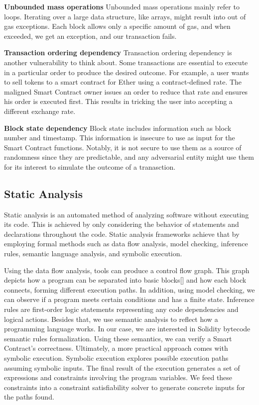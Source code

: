 \documentclass[a4paper,11pt]{article}
\begin{document}
\textbf{Unbounded mass operations}
Unbounded mass operations mainly refer to loops. Iterating over a large data
structure, like arrays, might result into out of gas exceptions. Each block
allows only a specific amount of gas, and when exceeded, we get an exception,
and our transaction fails.

\textbf{Transaction ordering dependency}
Transaction ordering dependency is another vulnerability to think about. Some
transactions are essential to execute in a particular order to produce the
desired outcome. For example, a user wants to sell tokens to a smart contract
for Ether using a contract-defined rate. The maligned Smart Contract owner
issues an order to reduce that rate and ensures his order is executed first.
This results in tricking the user into accepting a different exchange rate.

\textbf{Block state dependency}
Block state includes information such as block number and timestamp. This
information is insecure to use as input for the Smart Contract functions.
Notably, it is not secure to use them as a source of randomness since they are
predictable, and any adversarial entity might use them for its interest to
simulate the outcome of a tranasction.

\subsection{Static Analysis}

Static analysis is an automated method of analyzing software without executing
its code. This is achieved by only considering the behavior of statements and
declarations throughout the code. Static analysis frameworks achieve that by
employing formal methods such as data flow analysis, model checking, inference
rules, semantic language analysis, and symbolic execution. 

Using the data flow analysis, tools can produce a control flow graph. This graph
depicts how a program can be separated into basic blocks[] and how each block
connects, forming different execution paths. In addition, using model checking,
we can observe if a program meets certain conditions and has a finite state.
Inference rules are first-order logic statements representing any code
dependencies and logical actions. Besides that, we use semantic analysis to
reflect how a programming language works. In our case, we are interested in
Solidity bytecode semantic rules formalization. Using these semantics, we can
verify a Smart Contract's correctness. Ultimately, a more practical approach
comes with symbolic execution. Symbolic execution explores possible execution
paths assuming symbolic inputs. The final result of the execution generates a
set of expressions and constraints involving the program variables. We feed
these constraints into a constraint satisfiability solver to generate concrete
inputs for the paths found.
\end{document}
